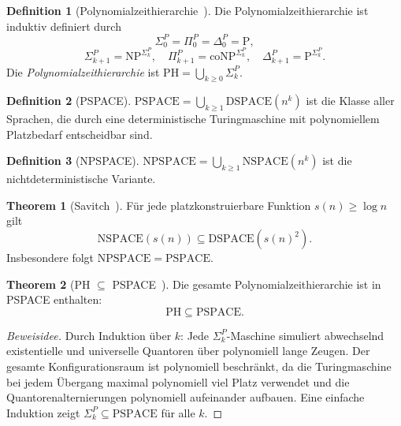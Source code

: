 ﻿\documentclass[a4paper,12pt]{article}
\theoremstyle{definition}
\newtheorem{definition}{Definition}
\newtheorem{theorem}{Theorem}
\begin{document}
\begin{definition}[Polynomialzeithierarchie~\cite{stockmeyer1976poly}]
  Die Polynomialzeithierarchie ist induktiv definiert durch
  \[
    \Sigma_0^P = \Pi_0^P = \Delta_0^P = \mathrm{P},
  \]
  \[
    \Sigma_{k+1}^P = \mathrm{NP}^{\Sigma_k^P}, \quad
    \Pi_{k+1}^P = \mathrm{coNP}^{\Sigma_k^P}, \quad
    \Delta_{k+1}^P = \mathrm{P}^{\Sigma_k^P}.
  \]
  Die \emph{Polynomialzeithierarchie} ist $\mathrm{PH} = \bigcup_{k \geq 0} \Sigma_k^P$.
\end{definition}

\begin{definition}[PSPACE]
  $\mathrm{PSPACE} = \bigcup_{k \geq 1} \mathrm{DSPACE}(n^k)$ ist die Klasse
  aller Sprachen, die durch eine deterministische Turingmaschine mit
  polynomiellem Platzbedarf entscheidbar sind.
\end{definition}

\begin{definition}[NPSPACE]
  $\mathrm{NPSPACE} = \bigcup_{k \geq 1} \mathrm{NSPACE}(n^k)$ ist die
  nichtdeterministische Variante.
\end{definition}

\begin{theorem}[Savitch~\cite{savitch1970relationships}]
\label{thm:savitch}
  Für jede platzkonstruierbare Funktion $s(n) \geq \log n$ gilt
  \[
    \mathrm{NSPACE}(s(n)) \subseteq \mathrm{DSPACE}(s(n)^2).
  \]
  Insbesondere folgt $\mathrm{NPSPACE} = \mathrm{PSPACE}$.
\end{theorem}

\begin{theorem}[PH $\subseteq$ PSPACE~\cite{papadimitriou1994complexity}]
\label{thm:ph_pspace}
  Die gesamte Polynomialzeithierarchie ist in PSPACE enthalten:
  \[
    \mathrm{PH} \subseteq \mathrm{PSPACE}.
  \]
\end{theorem}

\begin{proof}[Beweisidee]
  Durch Induktion über $k$: Jede $\Sigma_k^P$-Maschine simuliert
  abwechselnd existentielle und universelle Quantoren über polynomiell
  lange Zeugen. Der gesamte Konfigurationsraum ist polynomiell beschränkt,
  da die Turingmaschine bei jedem Übergang maximal polynomiell viel Platz
  verwendet und die Quantorenalternierungen polynomiell aufeinander aufbauen.
  Eine einfache Induktion zeigt $\Sigma_k^P \subseteq \mathrm{PSPACE}$ für alle $k$.
\end{proof}

\end{document}
